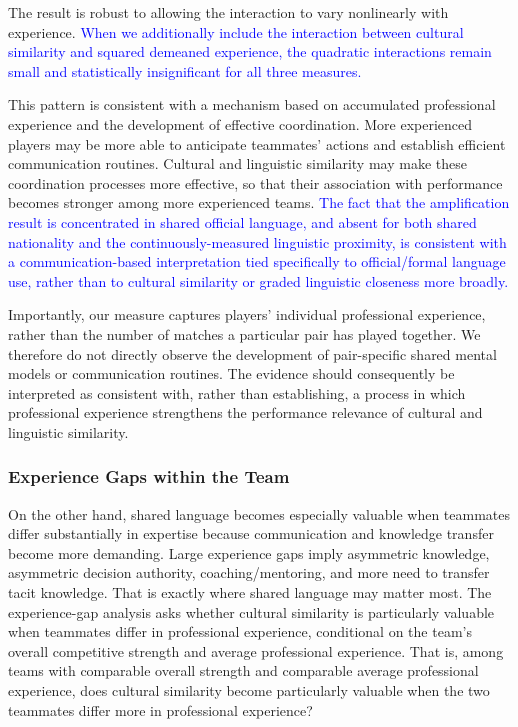 \documentclass[10pt]{article}
\begin{document}
The result is robust to allowing the interaction to vary nonlinearly with experience.
\textcolor{blue}{When we additionally include the interaction between cultural similarity and squared demeaned experience, the quadratic interactions remain small and statistically insignificant for all three measures.}

This pattern is consistent with a mechanism based on accumulated professional experience and the development of effective coordination. More experienced players may be more able to anticipate teammates' actions and establish efficient communication routines. Cultural and linguistic similarity may make these coordination processes more effective, so that their association with performance becomes stronger among more experienced teams. \textcolor{blue}{The fact that the amplification result is concentrated in shared official language, and absent for both shared nationality and the continuously-measured linguistic proximity, is consistent with a communication-based interpretation tied specifically to official/formal language use, rather than to cultural similarity or graded linguistic closeness more broadly.}

Importantly, our measure captures players' individual professional experience, rather than the number of matches a particular pair has played together. We therefore do not directly observe the development of pair-specific shared mental models or communication routines. The evidence should consequently be interpreted as consistent with, rather than establishing, a process in which professional experience strengthens the performance relevance of cultural and linguistic similarity.


\subsubsection{Experience Gaps within the Team} 

On the other hand, shared language becomes especially valuable when teammates differ substantially in expertise because communication and knowledge transfer become more demanding. Large experience gaps imply asymmetric knowledge, asymmetric decision authority, coaching/mentoring,
 and more need to transfer tacit knowledge. That is exactly where shared language may matter most. The experience-gap analysis asks whether cultural similarity is particularly valuable when teammates differ in professional experience, conditional on the team's overall competitive strength and average professional experience. That is, among teams with comparable overall strength and comparable average professional experience, does cultural similarity become particularly valuable when the two teammates differ more in professional experience?
\end{document}
